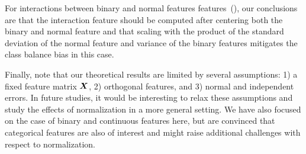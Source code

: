 For interactions between binary and normal features
features~(), our conclusions are that the interaction
feature should be computed after centering both the binary and normal feature and that
scaling with the product of the standard deviation of the normal feature and variance of
the binary features mitigates the class balance bias in this case.

Finally, note that our theoretical results are limited by several assumptions: 1) a fixed
feature matrix \(\bm{X}\), 2) orthogonal features, and 3) normal and independent errors.
In future studies, it would be interesting to relax these assumptions and study the effects
of normalization in a more general setting. We have also focused on the case of binary and
continuous features here, but are convinced that categorical features are also of interest
and might raise additional challenges with respect to normalization.
